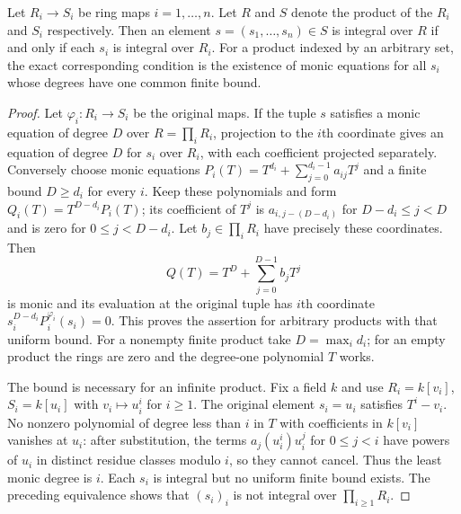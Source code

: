 \begin{lemma}
\label{editorial-source-lemma-finite-product-integral}
Let $R_i\to S_i$ be ring maps $i = 1, \ldots, n$.
Let $R$ and $S$ denote the product of the $R_i$ and $S_i$ respectively.
Then an element $s = (s_1, \ldots, s_n) \in S$ is integral over $R$
if and only if each $s_i$ is integral over $R_i$.
For a product indexed by an arbitrary set, the exact corresponding
condition is the existence of monic equations for all $s_i$ whose
degrees have one common finite bound.
\end{lemma}

\begin{proof}
Let $\varphi_i:R_i\to S_i$ be the original maps. If the tuple $s$
satisfies a monic equation of degree $D$ over $R=\prod_iR_i$,
projection to the $i$th coordinate gives an equation of degree $D$
for $s_i$ over $R_i$, with each coefficient projected separately.
Conversely choose monic equations
$P_i(T)=T^{d_i}+\sum_{j=0}^{d_i-1}a_{ij}T^j$ and a finite bound
$D\geq d_i$ for every $i$. Keep these polynomials and form
$Q_i(T)=T^{D-d_i}P_i(T)$; its coefficient of $T^j$ is
$a_{i,j-(D-d_i)}$ for $D-d_i\leq j<D$ and is zero for
$0\leq j<D-d_i$. Let $b_j\in\prod_iR_i$ have precisely these
coordinates. Then
$$
Q(T)=T^D+\sum_{j=0}^{D-1}b_jT^j
$$
is monic and its evaluation at the original tuple has $i$th coordinate
$s_i^{D-d_i}P_i^{\varphi_i}(s_i)=0$. This proves the assertion for
arbitrary products with that uniform bound. For a nonempty finite
product take $D=\max_i d_i$; for an empty product the rings are zero
and the degree-one polynomial $T$ works.

The bound is necessary for an infinite product. Fix a field $k$ and
use $R_i=k[v_i]$, $S_i=k[u_i]$ with $v_i\mapsto u_i^i$ for $i\geq1$.
The original element $s_i=u_i$ satisfies $T^i-v_i$.
No nonzero polynomial of degree less than $i$ in $T$ with
coefficients in $k[v_i]$ vanishes at $u_i$: after substitution,
the terms $a_j(u_i^i)u_i^j$ for $0\leq j<i$ have powers of $u_i$
in distinct residue classes modulo $i$, so they cannot cancel.
Thus the least monic degree is $i$. Each $s_i$ is integral but
no uniform finite bound exists. The preceding equivalence shows
that $(s_i)_i$ is not integral over $\prod_{i\geq1}R_i$.
\end{proof}